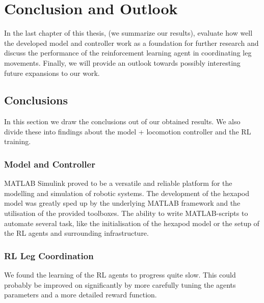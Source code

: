 \chapter{Conclusion and Outlook}
\label{ch:conclusion}

In the last chapter of this thesis, (we summarize our results), evaluate how well the developed model and controller work as a foundation for further research and discuss the performance of the reinforcement learning agent in coordinating leg movements.
Finally, we will provide an outlook towards possibly interesting future expansions to our work.


\section{Conclusions}
In this section we draw the conclusions out of our obtained results.
We also divide these into findings about the model + locomotion controller and the RL training.

\subsection{Model and Controller}
MATLAB Simulink proved to be a versatile and reliable platform for the modelling and simulation of robotic systems.
The development of the hexapod model was greatly sped up by the underlying MATLAB framework and the utilisation of the provided toolboxes.
The ability to write MATLAB-scripts to automate several task, like the initialisation of the hexapod model or the setup of the RL agents and surrounding infrastructure. 


\subsection{RL Leg Coordination}
We found the learning of the RL agents to progress quite slow. 
This could probably be improved on significantly by more carefully tuning the agents parameters and a more detailed reward function.

